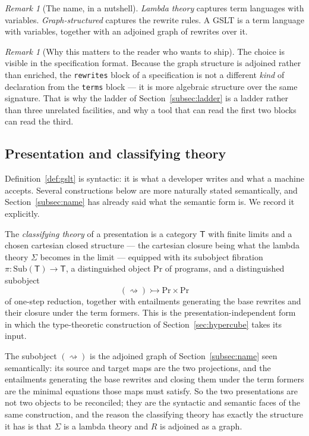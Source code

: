 \documentclass[11pt]{article}
\theoremstyle{definition}
\theoremstyle{plain}
\theoremstyle{remark}
\newtheorem{remark}[definition]{Remark}
\renewcommand{\Pr}{\mathrm{Pr}}
\newcommand{\rsq}{\rightsquigarrow}
\begin{document}
\begin{remark}[The name, in a nutshell]
\label{rem:nutshell}
\emph{Lambda theory} captures term languages with variables. \emph{Graph-structured}
captures the rewrite rules. A GSLT is a term language with variables, together with an
adjoined graph of rewrites over it.
\end{remark}

\begin{remark}[Why this matters to the reader who wants to ship]
The choice is visible in the specification format. Because the graph structure is
adjoined rather than enriched, the \texttt{rewrites} block of a specification is not a
different \emph{kind} of declaration from the \texttt{terms} block --- it is more
algebraic structure over the same signature. That is why the ladder of
Section~\ref{subsec:ladder} is a ladder rather than three unrelated facilities, and why a
tool that can read the first two blocks can read the third.
\end{remark}

\subsection{Presentation and classifying theory}
\label{subsec:classifying}

Definition~\ref{def:gslt} is syntactic: it is what a developer writes and what a machine
accepts. Several constructions below are more naturally stated semantically, and
Section~\ref{subsec:name} has already said what the semantic form is. We record it
explicitly.

The \emph{classifying theory} of a presentation is a category $\mathsf{T}$ with finite
limits and a chosen cartesian closed structure --- the cartesian closure being what the
lambda theory $\Sigma$ becomes in the limit --- equipped with its subobject fibration
$\pi : \mathrm{Sub}(\mathsf{T}) \to \mathsf{T}$, a distinguished object $\Pr$ of
programs, and a distinguished subobject
\[
  (\rsq) \rightarrowtail \Pr \times \Pr
\]
of one-step reduction, together with entailments generating the base rewrites and their
closure under the term formers. This is the presentation-independent form in which the
type-theoretic construction of Section~\ref{sec:hypercube} takes its input.

The subobject $(\rsq)$ is the adjoined graph of Section~\ref{subsec:name} seen
semantically: its source and target maps are the two projections, and the entailments
generating the base rewrites and closing them under the term formers are the minimal
equations those maps must satisfy. So the two presentations are not two objects to be
reconciled; they are the syntactic and semantic faces of the same construction, and the
reason the classifying theory has exactly the structure it has is that $\Sigma$ is a
lambda theory and $R$ is adjoined as a graph.
\end{document}
